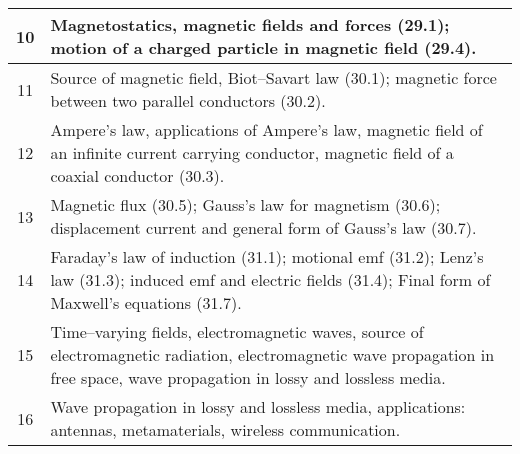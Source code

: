 \documentclass[12pt,a4paper]{article}
\begin{document}
\begin{center}
\begin{longtable}{|c|p{13cm}|}
		\hline
		10 \rule{0pt}{2.6ex} & Magnetostatics, magnetic fields and forces (29.1); motion of a charged particle in magnetic field (29.4).\\
		\hline
		11 \rule{0pt}{2.6ex} & Source of magnetic field, Biot--Savart law (30.1); magnetic force between two parallel conductors (30.2).\\
		\hline
		12 \rule{0pt}{2.6ex} & Ampere's law, applications of Ampere's law, magnetic field of an infinite current carrying conductor, magnetic field of a coaxial conductor (30.3).\\
		\hline
		13 \rule{0pt}{2.6ex} & Magnetic flux (30.5); Gauss's law for magnetism (30.6); displacement current and general form of Gauss's law (30.7).\\
		\hline
		14 \rule{0pt}{2.6ex} & Faraday's law of induction (31.1); motional emf (31.2); Lenz's law (31.3); induced emf and electric fields (31.4); Final form of Maxwell's equations (31.7).\\
		\hline
		15 \rule{0pt}{2.6ex} & Time--varying fields, electromagnetic waves, source of electromagnetic radiation, electromagnetic wave propagation in free space, wave propagation in lossy and lossless media.\\
		\hline
		16 \rule{0pt}{2.6ex} & Wave propagation in lossy and lossless media, applications: antennas, metamaterials, wireless communication.\\
	\hline \hline
	\end{longtable}
\end{center}

\end{document}
